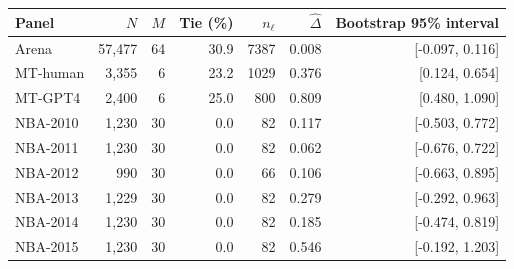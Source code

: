 \begin{tabular}{lrrrrrr}
\toprule
Panel & $N$ & $M$ & Tie (\%) & $n_\ell$ & $\widehat\Delta$ & Bootstrap 95\% interval \\
\midrule
Arena & 57,477 & 64 & 30.9 & 7387 & 0.008 & [-0.097, 0.116] \\
MT-human & 3,355 & 6 & 23.2 & 1029 & 0.376 & [0.124, 0.654] \\
MT-GPT4 & 2,400 & 6 & 25.0 & 800 & 0.809 & [0.480, 1.090] \\
NBA-2010 & 1,230 & 30 & 0.0 & 82 & 0.117 & [-0.503, 0.772] \\
NBA-2011 & 1,230 & 30 & 0.0 & 82 & 0.062 & [-0.676, 0.722] \\
NBA-2012 & 990 & 30 & 0.0 & 66 & 0.106 & [-0.663, 0.895] \\
NBA-2013 & 1,229 & 30 & 0.0 & 82 & 0.279 & [-0.292, 0.963] \\
NBA-2014 & 1,230 & 30 & 0.0 & 82 & 0.185 & [-0.474, 0.819] \\
NBA-2015 & 1,230 & 30 & 0.0 & 82 & 0.546 & [-0.192, 1.203] \\
\bottomrule
\end{tabular}
